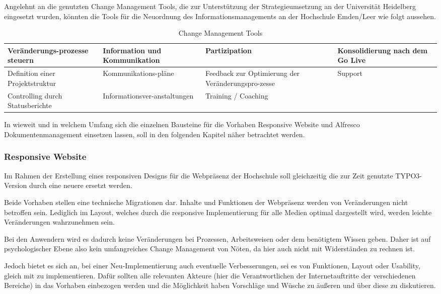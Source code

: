 Angelehnt an die genutzten Change Management Tools, die zur Unterstützung der Strategieumsetzung an der Universität Heidelberg eingesetzt wurden, könnten die Tools für die Neuordnung des Informationsmanagements an der Hochschule Emden/Leer wie folgt aussehen.

\begin{table}
	\begin{tabularx}{\textwidth}{|X|X|X|X|}
		\hline \textbf{Veränderungs-prozesse steuern} & \textbf{Information und Kommunikation} & \textbf{Partizipation} & \textbf{Konsolidierung nach dem Go Live}\\
		\hline Definition einer Projektstruktur & Kommunikations-pläne & Feedback zur Optimierung der Veränderungspro-zesse & Support\\
		\hline Controlling durch Statusberichte & Informationsver-anstaltungen & Training / Coaching & \\
		\hline
	\end{tabularx}
	\caption{Change Management Tools}
	\label{tab_change_management_tools}
\end{table}

In wieweit und in welchem Umfang sich die einzelnen Bausteine für die Vorhaben Responsive Website und Alfresco Dokumentenmanagement einsetzen lassen, soll in den folgenden Kapitel näher betrachtet werden.

\subsubsection{Responsive Website}
Im Rahmen der Erstellung eines responsiven Designs für die Webpräsenz der Hochschule soll gleichzeitig die zur Zeit genutzte TYPO3-Version durch eine neuere ersetzt werden. 

Beide Vorhaben stellen eine technische Migrationen dar. Inhalte und Funktionen  der Webpräsenz werden von Veränderungen nicht betroffen sein. Lediglich im Layout, welches durch die responsive Implementierung für alle Medien optimal dargestellt wird, werden leichte Veränderungen wahrzunehmen sein.

Bei den Anwendern wird es dadurch keine Veränderungen bei Prozessen, Arbeitsweisen oder dem benötigtem Wissen geben. Daher ist auf psychologischer Ebene also kein umfangreiches Change Management von Nöten, da hier auch nicht mit Widerständen zu rechnen ist.

Jedoch bietet es sich an, bei einer Neu-Implementierung auch eventuelle Verbesserungen, sei es von Funktionen, Layout oder Usability, gleich mit zu implementieren. Dafür sollten alle relevanten Akteure (hier die Verantwortlichen der Internetauftritte der verschiedenen Bereiche) in das Vorhaben einbezogen werden und die Möglichkeit haben Vorschläge und Wüsche zu äußeren und über diese zu diskutieren.

